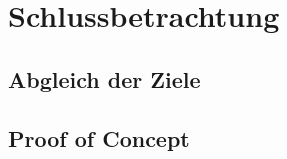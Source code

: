 
\chapter{Schlussbetrachtung}\label{cha:Schlussbetrachtung}

\section{Abgleich der Ziele}

\section{Proof of Concept}